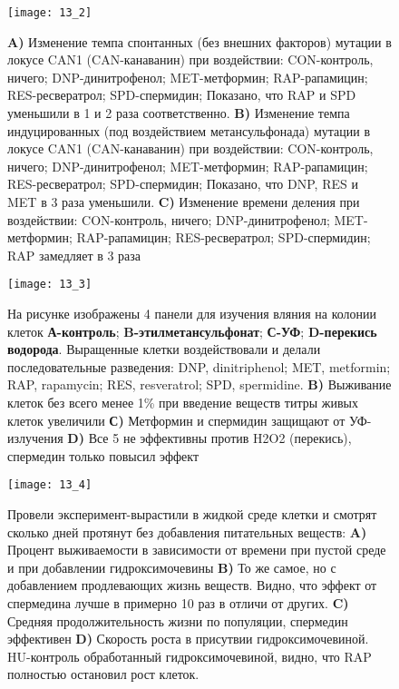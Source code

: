 \begin{figure}[H]
	\centering
	\texttt{[image: 13\_2]}
	\caption{\textbf{A)}	Изменение темпа спонтанных (без внешних факторов) мутации в локусе CAN1 (CAN-канаванин) при воздействии: CON-контроль, ничего; DNP-динитрофенол; MET-метформин; RAP-рапамицин; RES-ресвератрол; SPD-спермидин; Показано, что RAP и SPD уменьшили в 1 и 2 раза соответственно.
		\textbf{B)}	Изменение темпа индуцированных (под воздействием метансульфонада) мутации в локусе CAN1 (CAN-канаванин) при воздействии: CON-контроль, ничего; DNP-динитрофенол; MET-метформин; RAP-рапамицин; RES-ресвератрол; SPD-спермидин; Показано, что  DNP, RES и MET в 3 раза уменьшили.
		\textbf{C)}	Изменение времени деления при воздействии: CON-контроль, ничего; DNP-динитрофенол; MET-метформин; RAP-рапамицин; RES-ресвератрол; SPD-спермидин; RAP замедляет в 3 раза
	}
\end{figure}

\begin{figure}[H]
	\centering
	\texttt{[image: 13\_3]}
	\caption{На рисунке изображены 4 панели для изучения вляния на колонии клеток \textbf{А-контроль}; \textbf{B-этилметансульфонат}; \textbf{С-УФ}; \textbf{D-перекись водорода}. Выращенные клетки воздействовали и делали последовательные разведения: DNP, dinitriphenol; MET, metformin; RAP, rapamycin; RES, resveratrol; SPD, spermidine.
	\textbf{B)} Выживание клеток без всего менее 1\% при введение веществ титры живых клеток увеличили
	\textbf{С)} Метформин и спермидин защищают от УФ-излучения
	\textbf{D)} Все 5 не эффективны против H2O2 (перекись), спермедин только повысил эффект 
}
\end{figure}


\begin{figure}[H]
	\centering
	\texttt{[image: 13\_4]}
	\caption{Провели эксперимент-вырастили в жидкой среде клетки и смотрят сколько дней протянут без добавления питательных веществ:
		\textbf{A)}	Процент выживаемости в зависимости от времени при пустой среде и при добавлении гидроксимочевины
		\textbf{B)} То же самое, но с добавлением продлевающих жизнь веществ. Видно, что эффект от спермедина лучше в примерно 10 раз в отличи от других.
	\textbf{C)}	Средняя продолжительность жизни по популяции, спермедин эффективен
	\textbf{D)}	Скорость роста в присутвии гидроксимочевиной. HU-контроль обработанный гидроксимочевиной, видно, что RAP полностью остановил рост клеток.
}
\end{figure}